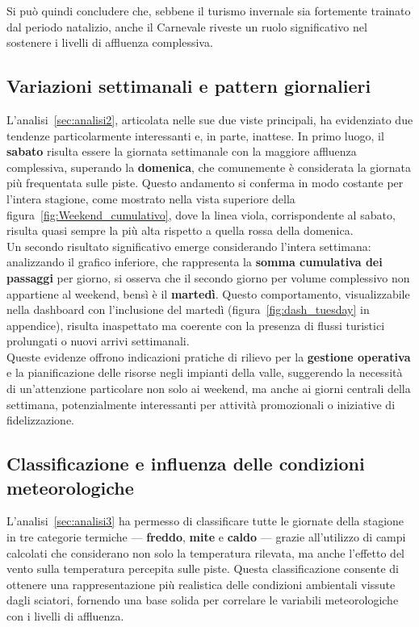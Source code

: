 Si può quindi concludere che, sebbene il turismo invernale sia fortemente trainato dal periodo natalizio, anche il Carnevale riveste un ruolo significativo nel sostenere i livelli di affluenza complessiva.

\subsection*{Variazioni settimanali e pattern giornalieri}
L’analisi~\ref{sec:analisi2}, articolata nelle sue due viste principali, ha evidenziato due tendenze particolarmente interessanti e, in parte, inattese.  
In primo luogo, il \textbf{sabato} risulta essere la giornata settimanale con la maggiore affluenza complessiva, superando la \textbf{domenica}, che comunemente è considerata la giornata più frequentata sulle piste.  
Questo andamento si conferma in modo costante per l’intera stagione, come mostrato nella vista superiore della figura~\ref{fig:Weekend_cumulativo}, dove la linea viola, corrispondente al sabato, risulta quasi sempre la più alta rispetto a quella rossa della domenica.\\

Un secondo risultato significativo emerge considerando l’intera settimana: analizzando il grafico inferiore, che rappresenta la \textbf{somma cumulativa dei passaggi} per giorno, si osserva che il secondo giorno per volume complessivo non appartiene al weekend, bensì è il \textbf{martedì}.  
Questo comportamento, visualizzabile nella dashboard con l’inclusione del martedì (figura~\ref{fig:dash_tuesday} in appendice), risulta inaspettato ma coerente con la presenza di flussi turistici prolungati o nuovi arrivi settimanali.\\

Queste evidenze offrono indicazioni pratiche di rilievo per la \textbf{gestione operativa} e la pianificazione delle risorse negli impianti della valle, suggerendo la necessità di un’attenzione particolare non solo ai weekend, ma anche ai giorni centrali della settimana, potenzialmente interessanti per attività promozionali o iniziative di fidelizzazione.


\subsection*{Classificazione e influenza delle condizioni meteorologiche}
L’analisi~\ref{sec:analisi3} ha permesso di classificare tutte le giornate della stagione in tre categorie termiche — \textbf{freddo}, \textbf{mite} e \textbf{caldo} — grazie all’utilizzo di campi calcolati che considerano non solo la temperatura rilevata, ma anche l’effetto del vento sulla temperatura percepita sulle piste.  
Questa classificazione consente di ottenere una rappresentazione più realistica delle condizioni ambientali vissute dagli sciatori, fornendo una base solida per correlare le variabili meteorologiche con i livelli di affluenza.\\

